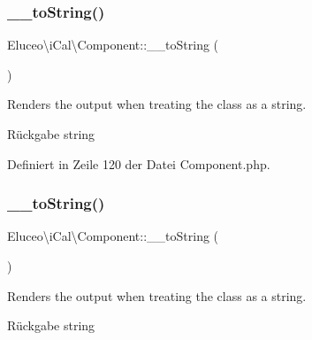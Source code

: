 \mbox{\label{class_eluceo_1_1i_cal_1_1_component_a34a07b7c39eedd49d4ef421b2d1dddd9}} 
\subsubsection{\texorpdfstring{\+\_\+\+\_\+to\+String()}{\_\_toString()}\hspace{0.1cm}{\footnotesize\ttfamily [2/3]}}
{\footnotesize\ttfamily Eluceo\textbackslash{}i\+Cal\textbackslash{}\+Component\+::\+\_\+\+\_\+to\+String (\begin{DoxyParamCaption}{ }\end{DoxyParamCaption})}

Renders the output when treating the class as a string.

\begin{DoxyReturn}{Rückgabe}
string 
\end{DoxyReturn}


Definiert in Zeile 120 der Datei Component.\+php.

\mbox{\label{class_eluceo_1_1i_cal_1_1_component_a34a07b7c39eedd49d4ef421b2d1dddd9}} 
\subsubsection{\texorpdfstring{\+\_\+\+\_\+to\+String()}{\_\_toString()}\hspace{0.1cm}{\footnotesize\ttfamily [3/3]}}
{\footnotesize\ttfamily Eluceo\textbackslash{}i\+Cal\textbackslash{}\+Component\+::\+\_\+\+\_\+to\+String (\begin{DoxyParamCaption}{ }\end{DoxyParamCaption})}

Renders the output when treating the class as a string.

\begin{DoxyReturn}{Rückgabe}
string 
\end{DoxyReturn}


